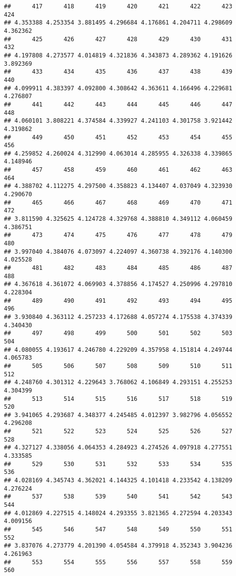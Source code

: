 \documentclass[
]{article}
\begin{document}
\begin{verbatim}
##      417      418      419      420      421      422      423      424 
## 4.353388 4.253354 3.881495 4.296684 4.176861 4.204711 4.298609 4.362362 
##      425      426      427      428      429      430      431      432 
## 4.197808 4.273577 4.014819 4.321836 4.343873 4.289362 4.191626 3.892369 
##      433      434      435      436      437      438      439      440 
## 4.099911 4.383397 4.092800 4.308642 4.363611 4.166496 4.229681 4.276807 
##      441      442      443      444      445      446      447      448 
## 4.060101 3.808221 4.374584 4.339927 4.241103 4.301758 3.921442 4.319862 
##      449      450      451      452      453      454      455      456 
## 4.259852 4.260024 4.312990 4.063014 4.285955 4.326338 4.339865 4.148946 
##      457      458      459      460      461      462      463      464 
## 4.388702 4.112275 4.297500 4.358823 4.134407 4.037049 4.323930 4.290670 
##      465      466      467      468      469      470      471      472 
## 3.811590 4.325625 4.124728 4.329768 4.388810 4.349112 4.060459 4.386751 
##      473      474      475      476      477      478      479      480 
## 3.997040 4.384076 4.073097 4.224097 4.360738 4.392176 4.140300 4.025528 
##      481      482      483      484      485      486      487      488 
## 4.367618 4.361072 4.069903 4.378856 4.174527 4.250996 4.297810 4.228304 
##      489      490      491      492      493      494      495      496 
## 3.930840 4.363112 4.257233 4.172688 4.057274 4.175538 4.374339 4.340430 
##      497      498      499      500      501      502      503      504 
## 4.080055 4.193617 4.246780 4.229209 4.357958 4.151814 4.249744 4.065783 
##      505      506      507      508      509      510      511      512 
## 4.248760 4.301312 4.229643 3.768062 4.106849 4.293151 4.255253 4.304399 
##      513      514      515      516      517      518      519      520 
## 3.941065 4.293687 4.348377 4.245485 4.012397 3.982796 4.056552 4.296208 
##      521      522      523      524      525      526      527      528 
## 4.327127 4.338056 4.064353 4.284923 4.274526 4.097918 4.277551 4.333585 
##      529      530      531      532      533      534      535      536 
## 4.028169 4.345743 4.362021 4.144325 4.101418 4.233542 4.138209 4.276224 
##      537      538      539      540      541      542      543      544 
## 4.012869 4.227515 4.148024 4.293355 3.821365 4.272594 4.203343 4.009156 
##      545      546      547      548      549      550      551      552 
## 3.837076 4.273779 4.201390 4.054584 4.379918 4.352343 3.904236 4.261963 
##      553      554      555      556      557      558      559      560 

\end{verbatim}
\end{document}
